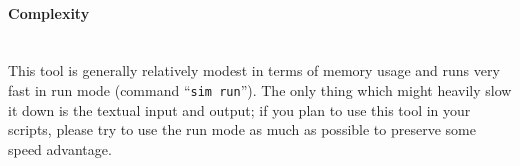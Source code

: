         \paragraph{Complexity}~\\
            This tool is generally relatively modest in terms of memory usage and runs very fast in run mode (command ``\texttt{sim~run}''). The only thing which might heavily slow it down is the textual input and output; if you plan to use this tool in your scripts, please try to use the run mode as much as possible to preserve some speed advantage.
